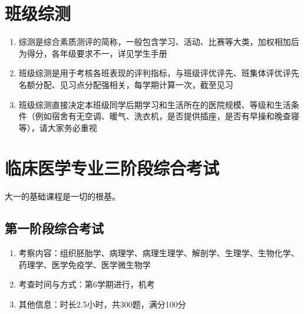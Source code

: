 \section[班级综测]{班级综测}
\label{class_evaluation}
\begin{enumerate}
    \item 综测是综合素质测评的简称，一般包含学习、活动、比赛等大类，加权相加后为得分，各年级要求不一，详见学生手册
    \item 班级综测是用于考核各班表现的评判指标，与班级评优评先、班集体评优评先名额分配、见习点分配\footnotemark 强相关，每学期计算一次，截至见习
    \item 班级综测直接决定本班级同学后期学习和生活所在的医院规模、等级和生活条件（例如宿舍有无空调、暖气、洗衣机，是否提供插座，是否有早操和晚查寝\footnotemark 等），请大家务必重视
\end{enumerate}

\section[临床医学专业三阶段综合考试]{临床医学专业三阶段综合考试}
大一的基础课程是一切的根基。

\subsection[第一阶段综合考试]{第一阶段综合考试}
\begin{enumerate}
    \item 考察内容：组织胚胎学、病理学、病理生理学、解剖学、生理学、生物化学、药理学、医学免疫学、医学微生物学
    \item 考查时间与方式：第6学期进行，机考
    \item 其他信息：时长2.5小时，共300题，满分100分
\end{enumerate}

